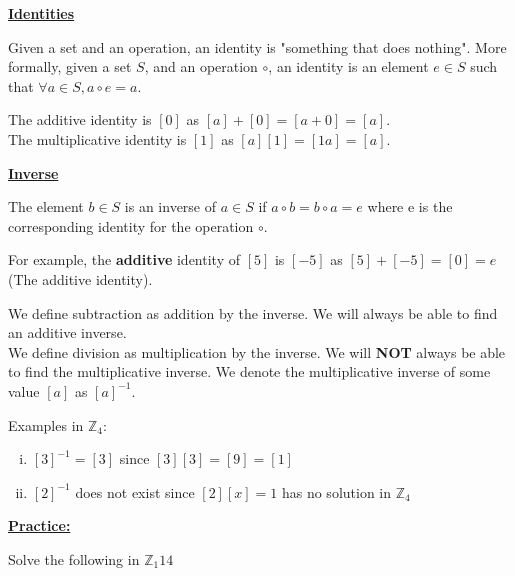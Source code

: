 \documentclass{letter}
\begin{document}
	\underline{\textbf{Identities}}
	
	Given a set and an operation, an identity is "something that does nothing". More formally, given a set $S$, and an operation $\circ$, an identity is an element $e \in S$ such that $\forall a \in S, a \circ e = a$.
	
	The additive identity is $[0]$ as $[a] + [0] = [a + 0] = [a]$.\\
	The multiplicative identity is $[1]$ as $[a][1] = [1a] = [a]$.\\
	\pagebreak
	
	\underline{\textbf{Inverse}}
	
	The element $b \in S$ is an inverse of $a \in S$ if $a \circ b = b \circ a = e$ where e is the corresponding identity for the operation $\circ$.
	
	For example, the \textbf{additive} identity of $[5]$ is $[-5]$ as $[5] + [-5] = [0] = e$ (The additive identity).
	
	We define subtraction as addition by the inverse. We will always be able to find an additive inverse.\\
	We define division as multiplication by the inverse. We will \textbf{NOT} always be able to find the multiplicative inverse. We denote the multiplicative inverse of some value $[a]$ as $[a]^{-1}$.
	
	Examples in $\mathbb{Z}_4$:
	\begin{enumerate} [i)]
		\item $[3]^{-1} = [3]$ since $[3][3] = [9] = [1]$
		\item $[2]^{-1}$ does not exist since $[2][x] = 1$ has no solution in $\mathbb{Z}_4$
	\end{enumerate}
	
	\underline{\textbf{Practice:}}
	
	Solve the following in $\mathbb{Z}_1{14}$
	
\end{document}
